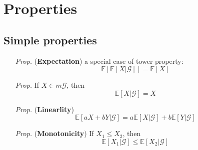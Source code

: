 \documentclass[a4paper,12pt,twoside]{book}
\begin{document}
\section{Properties}

\subsection{Simple properties}
\begin{itemize}
	\item[\textit{Prop.}] (\textbf{Expectation}) a special case of tower property:
	\begin{equation}
		\mathbb{E}\left[\mathbb{E}\left[X|\mathcal{G}\right]\right] = \mathbb{E}\left[X\right]
	\end{equation}

	\item[\textit{Prop.}] If $X\in m \mathcal{G}$, then
	\begin{equation}
		\mathbb{E}\left[X|\mathcal{G}\right] = X
	\end{equation}

	\item[\textit{Prop.}] (\textbf{Linearlity})
	\begin{equation}
		\mathbb{E}\left[aX+bY|\mathcal{G}\right]=a \mathbb{E}\left[X|\mathcal{G}\right] + b \mathbb{E}\left[Y|\mathcal{G}\right]
	\end{equation}

	\item[\textit{Prop.}] (\textbf{Monotonicity}) If $X_1\leq X_2$, then
	\begin{equation}
		\mathbb{E}\left[X_1|\mathcal{G}\right]\leq \mathbb{E}\left[X_2|\mathcal{G}\right]
	\end{equation}
\end{itemize}

\end{document}

